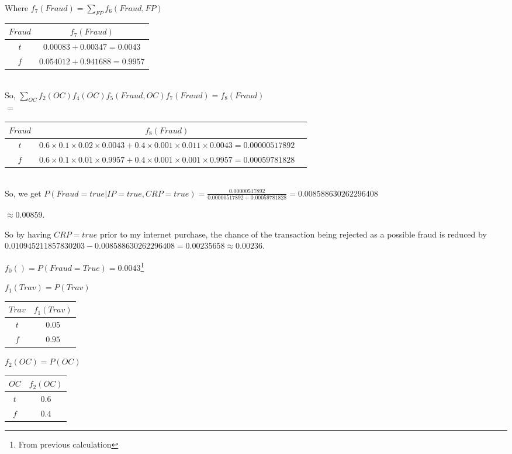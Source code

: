 \documentclass[10pt]{article}
\begin{document}
\begin{enumerate}
	Where $f_7(Fraud) = \sum_{FP} f_6(Fraud, FP)$
	
	\begin{tabular}{|c|c|}
	\hline
 	  $Fraud$ & $f_7(Fraud)$ \\
	\hline
	  $t$ & $ 0.00083 + 0.00347 = 0.0043$  \\
	\hline
	  $f$ & $ 0.054012 + 0.941688 = 0.9957$ \\
	\hline
	\end{tabular}\\
	
	So, $\sum_{OC} f_2(OC) f_4(OC) f_5(Fraud, OC) f_7(Fraud) = f_{8}(Fraud)$\\

	$=$
	\begin{tabular}{|c|c|c|}
	\hline
 	  $Fraud$ & $f_8(Fraud)$ \\
	\hline
	  $t$ & $0.6 \times 0.1 \times 0.02 \times 0.0043 + 0.4 \times 0.001 \times 0.011 \times 0.0043 = 0.00000517892$  \\
	\hline
	  $f$ & $0.6 \times 0.1 \times 0.01 \times 0.9957 + 0.4 \times 0.001 \times 0.001 \times 0.9957 = 0.00059781828$ \\
	\hline
	\end{tabular}\\	
	
	So, we get $P(Fraud = true | IP = true, CRP = true) = \frac{0.00000517892}{0.00000517892 + 0.00059781828} = 0.008588630262296408$
	
	$\approx 0.00859$.
	
	So by having $CRP = true$ prior to my internet purchase, the chance of the transaction being rejected as a possible fraud is reduced by $0.010945211857830203 - 0.008588630262296408 = 0.00235658 \approx 0.00236$. 
\end{enumerate}


\iffalse
	
	$f_0() = P(Fraud = True) = 0.0043$\footnote{From previous calculation}
	
	$f_1(Trav) = P(Trav)$ 
	\begin{tabular}{|c|c|}
	\hline
 	  $Trav$ & $f_1(Trav)$ \\
	\hline
	  $t$ & $ 0.05$  \\
	\hline
	  $f$ & $0.95$ \\
	\hline
	\end{tabular}
	
	$f_2(OC) = P(OC)$
	\begin{tabular}{|c|c|}
	\hline
 	  $OC$ & $f_2(OC)$ \\
	\hline
	  $t$ & $ 0.6$  \\
	\hline
	  $f$ & $0.4$ \\
	\hline
	\end{tabular}
	
\end{document}
